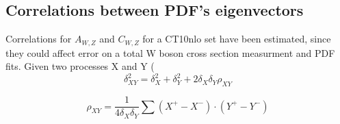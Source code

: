 \subsection{Correlations between PDF's eigenvectors}
Correlations for $A_{W,Z}$ and $C_{W,Z}$ for a CT10nlo set have been estimated, since they could affect error on a total W boson cross section measurment and PDF fits. Given two processes X and Y (
\begin{equation}
\delta_{XY}^2 = \delta_X^2+\delta_Y^2+2\delta_X\delta_Y\rho_{XY}
\end{equation} 

\begin{equation}
\rho_{XY}=\frac{1}{4\delta_X\delta_Y}\sum(X^{+}-X^{-})\cdot (Y^{+}-Y^{-})
\end{equation}
